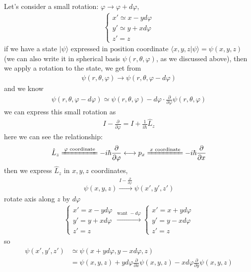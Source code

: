 \documentclass[UTF8,12pt]{article} %
\numberwithin{equation}{section}
\begin{document}
Let's consider a small rotation: $\varphi \rightarrow \varphi + d\varphi$,
\begin{align}
\begin{cases}
x' \simeq x - yd\varphi \\
y' \simeq y + xd\varphi \\
z' = z
\end{cases}
\end{align}
if we have a state $|\psi\rangle$ expressed in position coordinate $\langle x,y,z|\psi\rangle = \psi(x,y,z)$ (we can also write it in spherical basis $\psi(r,\theta,\varphi)$, as we discussed above), then we apply a rotation to the state, we get from
\begin{align}
\psi(r,\theta,\varphi) \rightarrow \psi(r,\theta,\varphi - d\varphi)
\end{align}
and we know
\begin{align}
\psi(r,\theta,\varphi - d\varphi) \simeq \psi(r,\theta,\varphi) - d\varphi \cdot \frac{\partial}{\partial \varphi} \psi(r,\theta,\varphi)
\end{align}
we can express this small rotation as
\begin{align}
I - \frac{\partial}{\partial\varphi} = I + \frac{1}{i\hbar}\hat{L}_{z}
\end{align}
here we can see the relationship:
\begin{align}
\hat{L}_{z} \xlongequal{\varphi\text{ coordinate}} -i\hbar\frac{\partial}{\partial\varphi} \longleftrightarrow p_{x} \xlongequal{x\text{ coordinate}} -i\hbar\frac{\partial}{\partial x}
\end{align}
then we express $\hat{L}_{z}$ in $x,y,z$ coordinates,
\begin{align}
\psi(x,y,z) \xrightarrow{I - \frac{\partial}{\partial \varphi}} \psi(x', y', z')
\end{align}
rotate axis along $z$ by $d\varphi$
\begin{align}
\begin{cases}
x' = x - yd\varphi \\
y' = y + xd\varphi \\
z' = z
\end{cases}
\xrightarrow{\text{want } -d\varphi}
\begin{cases}
x' = x + yd\varphi \\
y' = y - xd\varphi \\
z' = z
\end{cases}
\end{align}
so
\begin{align}
\psi(x', y', z') &\simeq \psi(x + yd\varphi, y - xd\varphi,z) \\
&= \psi(x,y,z) + yd\varphi\frac{\partial}{\partial x}\psi(x,y,z) - xd\varphi\frac{\partial}{\partial y}\psi(x,y,z)
\end{align}
\end{document}
